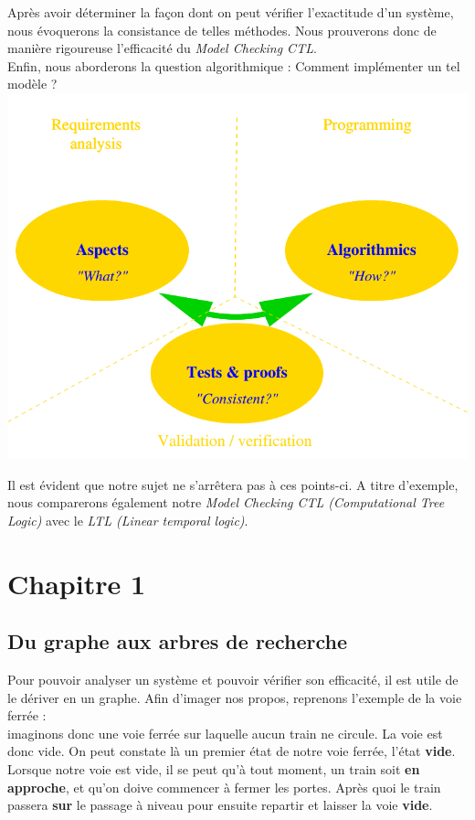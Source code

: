 \documentclass[11pt,a4paper]{article}
\begin{document}
\noindent Après avoir déterminer la façon dont on peut vérifier l'exactitude d'un système, nous évoquerons la consistance de telles méthodes. Nous prouverons donc de manière rigoureuse l'efficacité du \textit{Model Checking CTL}. \\

\noindent Enfin, nous aborderons la question algorithmique : Comment implémenter un tel modèle ? \\

\includegraphics[scale=0.5]{points.png}

\noindent Il est évident que notre sujet ne s'arrêtera pas à ces points-ci. A titre d'exemple, nous comparerons également notre \textit{Model Checking CTL (Computational Tree Logic)} avec le \textit{LTL (Linear temporal logic)}.

\newpage

\section{Chapitre 1}
\subsection{Du graphe aux arbres de recherche}

Pour pouvoir analyser un système et pouvoir vérifier son efficacité, il est utile de le dériver en un graphe. Afin d'imager nos propos, reprenons l'exemple de la voie ferrée :\\ imaginons donc une voie ferrée sur laquelle aucun train ne circule. La voie est donc vide. On peut constate là un premier état de notre voie ferrée, l'état \textbf{vide}. Lorsque notre voie est vide, il se peut qu'à tout moment, un train soit \textbf{en approche}, et qu'on doive commencer à fermer les portes. Après quoi le train passera \textbf{sur} le passage à niveau pour ensuite repartir et laisser la voie \textbf{vide}.\\
\end{document}
